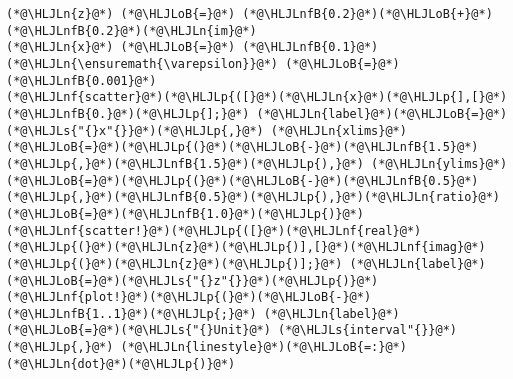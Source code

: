 \documentclass[12pt,a4paper]{article}
\newcommand{\HLJLn}[1]{#1}
\newcommand{\HLJLnf}[1]{\textcolor[RGB]{66,102,213}{#1}}
\newcommand{\HLJLs}[1]{\textcolor[RGB]{201,61,57}{#1}}
\newcommand{\HLJLnfB}[1]{\textcolor[RGB]{59,151,46}{#1}}
\newcommand{\HLJLoB}[1]{\textcolor[RGB]{102,102,102}{\textbf{#1}}}
\newcommand{\HLJLp}[1]{#1}
\begin{document}
\begin{lstlisting}
(*@\HLJLn{z}@*) (*@\HLJLoB{=}@*) (*@\HLJLnfB{0.2}@*)(*@\HLJLoB{+}@*)(*@\HLJLnfB{0.2}@*)(*@\HLJLn{im}@*)
(*@\HLJLn{x}@*) (*@\HLJLoB{=}@*) (*@\HLJLnfB{0.1}@*)
(*@\HLJLn{\ensuremath{\varepsilon}}@*) (*@\HLJLoB{=}@*) (*@\HLJLnfB{0.001}@*)
(*@\HLJLnf{scatter}@*)(*@\HLJLp{([}@*)(*@\HLJLn{x}@*)(*@\HLJLp{],[}@*)(*@\HLJLnfB{0.}@*)(*@\HLJLp{];}@*) (*@\HLJLn{label}@*)(*@\HLJLoB{=}@*)(*@\HLJLs{"{}x"{}}@*)(*@\HLJLp{,}@*) (*@\HLJLn{xlims}@*)(*@\HLJLoB{=}@*)(*@\HLJLp{(}@*)(*@\HLJLoB{-}@*)(*@\HLJLnfB{1.5}@*)(*@\HLJLp{,}@*)(*@\HLJLnfB{1.5}@*)(*@\HLJLp{),}@*) (*@\HLJLn{ylims}@*)(*@\HLJLoB{=}@*)(*@\HLJLp{(}@*)(*@\HLJLoB{-}@*)(*@\HLJLnfB{0.5}@*)(*@\HLJLp{,}@*)(*@\HLJLnfB{0.5}@*)(*@\HLJLp{),}@*)(*@\HLJLn{ratio}@*)(*@\HLJLoB{=}@*)(*@\HLJLnfB{1.0}@*)(*@\HLJLp{)}@*)
(*@\HLJLnf{scatter!}@*)(*@\HLJLp{([}@*)(*@\HLJLnf{real}@*)(*@\HLJLp{(}@*)(*@\HLJLn{z}@*)(*@\HLJLp{)],[}@*)(*@\HLJLnf{imag}@*)(*@\HLJLp{(}@*)(*@\HLJLn{z}@*)(*@\HLJLp{)];}@*) (*@\HLJLn{label}@*)(*@\HLJLoB{=}@*)(*@\HLJLs{"{}z"{}}@*)(*@\HLJLp{)}@*)
(*@\HLJLnf{plot!}@*)(*@\HLJLp{(}@*)(*@\HLJLoB{-}@*)(*@\HLJLnfB{1..1}@*)(*@\HLJLp{;}@*) (*@\HLJLn{label}@*)(*@\HLJLoB{=}@*)(*@\HLJLs{"{}Unit}@*) (*@\HLJLs{interval"{}}@*)(*@\HLJLp{,}@*) (*@\HLJLn{linestyle}@*)(*@\HLJLoB{=:}@*)(*@\HLJLn{dot}@*)(*@\HLJLp{)}@*)


\end{lstlisting}
\end{document}

